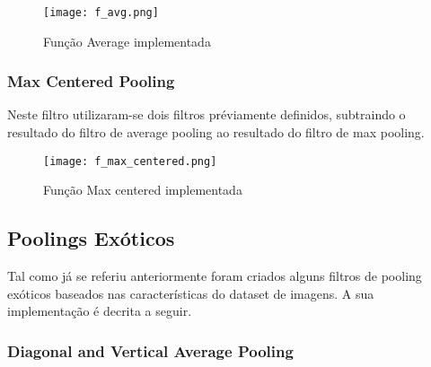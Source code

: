 	\begin{figure}[H]

	  \centering
	  \captionsetup{justification=centering}

	  \texttt{[image: f\_avg.png]}
	  
	  \caption {Função Average implementada}
	\end{figure}

\subsubsection{Max Centered Pooling}\hfill\newline
	\hfill\newline

	Neste filtro utilizaram-se dois filtros préviamente definidos, subtraindo o resultado do filtro de average pooling ao resultado do filtro de max pooling. 


	\begin{figure}[H]

	  \centering
	  \captionsetup{justification=centering}

	  \texttt{[image: f\_max\_centered.png]}
	  
	  \caption {Função Max centered implementada}
	\end{figure}



\subsection{Poolings Exóticos}\hfill\newline
\hfill\newline

Tal como já se referiu anteriormente foram criados alguns filtros de pooling exóticos baseados nas características do dataset de imagens. A sua implementação é decrita a seguir.

\subsubsection{ Diagonal and Vertical Average Pooling}\hfill\newline
  \hfill\newline

